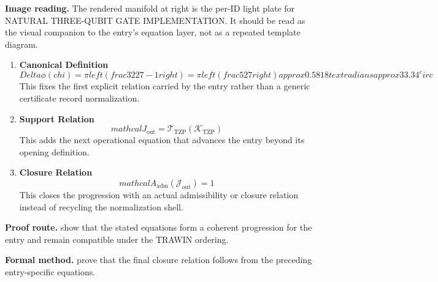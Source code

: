 \begin{samepage}
\noindent\begin{minipage}[t]{0.45\linewidth}
\vspace{0pt}
\raggedright
\scriptsize\textbf{Image reading.} The rendered manifold at right is the per-ID light plate for NATURAL THREE-QUBIT GATE IMPLEMENTATION. It should be read as the visual companion to the entry's equation layer, not as a repeated template diagram.\par
\end{minipage}\hfill
\begin{minipage}[t]{0.53\linewidth}
\vspace*{-0.10in}
\raggedright
{}
\end{minipage}
\end{samepage}

\clearpage


\begin{enumerate}[leftmargin=1.6em,itemsep=9pt,topsep=6pt]
\item \textbf{Canonical Definition}
\[
Delta \phi( chi) = \pi left( frac{32}{27} - 1 right) = \pi left( frac{5}{27} right) approx 0.5818 text{ radians} approx 33.34^ circ
\]
This fixes the first explicit relation carried by the entry rather than a generic certificate record normalization.

\item \textbf{Support Relation}
\[
mathcal{J}_{\mathrm{out}} = \mathcal{T}_{\mathrm{TZP}}\!\left(\mathcal{K}_{\mathrm{TZP}}\right)
\]
This adds the next operational equation that advances the entry beyond its opening definition.

\item \textbf{Closure Relation}
\[
mathcal{A}_{\mathrm{adm}}\!\left(\mathcal{J}_{\mathrm{out}}\right)=1
\]
This closes the progression with an actual admissibility or closure relation instead of recycling the normalization shell.
\end{enumerate}

\textbf{Proof route.} show that the stated equations form a coherent progression for the entry and remain compatible under the TRAWIN ordering.

\textbf{Formal method.} prove that the final closure relation follows from the preceding entry-specific equations.

